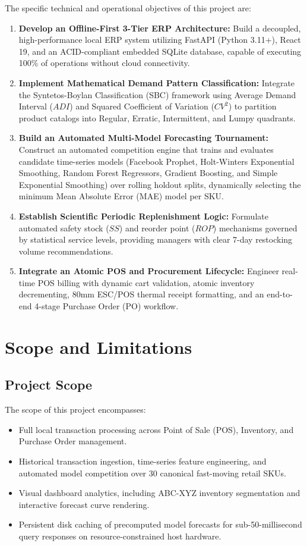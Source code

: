The specific technical and operational objectives of this project are:
\begin{enumerate}
    \item \textbf{Develop an Offline-First 3-Tier ERP Architecture:} Build a decoupled, high-performance local ERP system utilizing FastAPI (Python 3.11+), React 19, and an ACID-compliant embedded SQLite database, capable of executing 100\% of operations without cloud connectivity.
    \item \textbf{Implement Mathematical Demand Pattern Classification:} Integrate the Syntetos-Boylan Classification (SBC) framework using Average Demand Interval ($ADI$) and Squared Coefficient of Variation ($CV^2$) to partition product catalogs into Regular, Erratic, Intermittent, and Lumpy quadrants.
    \item \textbf{Build an Automated Multi-Model Forecasting Tournament:} Construct an automated competition engine that trains and evaluates candidate time-series models (Facebook Prophet, Holt-Winters Exponential Smoothing, Random Forest Regressors, Gradient Boosting, and Simple Exponential Smoothing) over rolling holdout splits, dynamically selecting the minimum Mean Absolute Error (MAE) model per SKU.
    \item \textbf{Establish Scientific Periodic Replenishment Logic:} Formulate automated safety stock ($SS$) and reorder point ($ROP$) mechanisms governed by statistical service levels, providing managers with clear 7-day restocking volume recommendations.
    \item \textbf{Integrate an Atomic POS and Procurement Lifecycle:} Engineer real-time POS billing with dynamic cart validation, atomic inventory decrementing, 80mm ESC/POS thermal receipt formatting, and an end-to-end 4-stage Purchase Order (PO) workflow.
\end{enumerate}

\section{Scope and Limitations}
\subsection{Project Scope}
The scope of this project encompasses:
\begin{itemize}
    \item Full local transaction processing across Point of Sale (POS), Inventory, and Purchase Order management.
    \item Historical transaction ingestion, time-series feature engineering, and automated model competition over 30 canonical fast-moving retail SKUs.
    \item Visual dashboard analytics, including ABC-XYZ inventory segmentation and interactive forecast curve rendering.
    \item Persistent disk caching of precomputed model forecasts for sub-50-millisecond query responses on resource-constrained host hardware.
\end{itemize}

